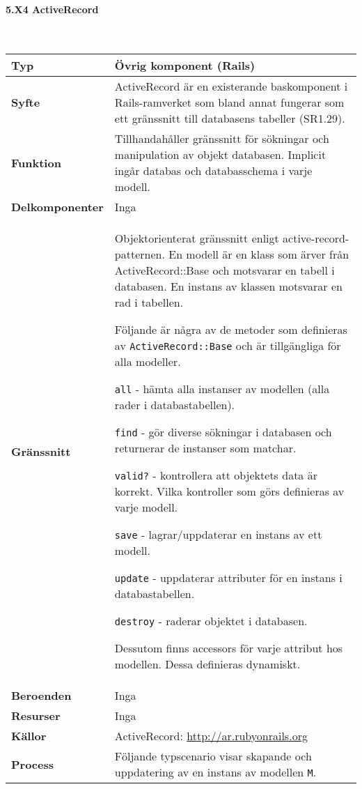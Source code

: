 \documentclass[a4paper, twoside, 11pt, titlepage]{article}
\begin{document}
			\clearpage %
			\paragraph{5.X4 ActiveRecord}\

			\begin {table} [ht] \begin{tabular} {  p{3.5cm} p{11.6cm} }
				\hline
				{\sffamily\textbf{Typ}} & {Övrig komponent (Rails)} \\
				\hline
				{\sffamily\textbf{Syfte}} & {ActiveRecord är en existerande baskomponent i Rails-ramverket som bland annat fungerar som ett gränssnitt till databasens tabeller (SR1.29). } \\
				\hline
				{\sffamily\textbf{Funktion}} & {Tillhandahåller gränssnitt för sökningar och manipulation av objekt databasen. Implicit ingår databas och databasschema i varje modell.} \\
				\hline
				{\sffamily\textbf{Delkomponenter}} & { Inga} \\
				\hline
				{\sffamily\textbf{Gränssnitt}} & {Objektorienterat gränssnitt enligt active-record-patternen. En modell är en klass som ärver från ActiveRecord::Base och motsvarar en tabell i databasen. En instans av klassen motsvarar en rad i tabellen.

Följande är några av de metoder som definieras av {\tt ActiveRecord::Base} och är tillgängliga för alla modeller.

{\tt all} - hämta alla instanser av modellen (alla rader i databastabellen).

{\tt find} - gör diverse sökningar i databasen och returnerar de instanser som matchar.

{\tt valid?} - kontrollera att objektets data är korrekt. Vilka kontroller som görs definieras av varje modell.

{\tt save} - lagrar/uppdaterar en instans av ett modell.

{\tt update} - uppdaterar attributer för en instans i databastabellen.

{\tt destroy} - raderar objektet i databasen.

Dessutom finns accessors för varje attribut hos modellen. Dessa definieras dynamiskt.} \\
				\hline
				{\sffamily\textbf{Beroenden}} & {Inga} \\
				\hline
				{\sffamily\textbf{Resurser}} & {Inga} \\
				\hline
				{\sffamily\textbf{Källor}} & {ActiveRecord: \url{http://ar.rubyonrails.org}} \\
				\hline
				{\sffamily\textbf{Process}} & {Följande typscenario visar skapande och uppdatering av en instans av modellen {\tt M}.

}
\end{tabular}
\end{table}
\end{document}
